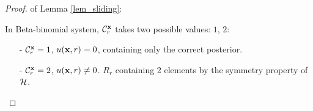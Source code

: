 \documentclass{article}
\begin{document}
\begin{proof} of Lemma \ref{lem_sliding}:

In Beta-binomial system, $\mathcal{C}^{\textbf{x}}_{r}$ takes two possible values: $1$, $2$:
\begin{itemize}
  \item[-] $\mathcal{C}^{\textbf{x}}_{r} = 1$, $u(\textbf{x}, {r}) = 0$,  containing only the correct posterior.
  \item[-] $\mathcal{C}^{\textbf{x}}_{r} = 2$, $u(\textbf{x}, {r}) \neq 0$. $R_r$ containing 2 elements by the symmetry property of $\mathcal{H}$.
\end{itemize}



\end{proof}
\end{document}
